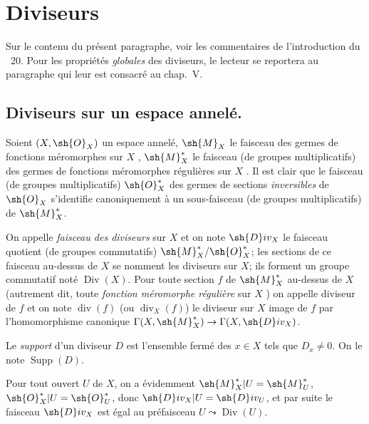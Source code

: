 \section{Diviseurs}
\label{section:IV.21}

Sur le contenu du présent paragraphe, voir les commentaires de l'introduction du \textsection~20.
Pour les propriétés \emph{globales} des diviseurs, le lecteur se reportera au paragraphe qui leur est consacré au chap.~V.

\subsection{Diviseurs sur un espace annelé.}
\label{IV.21.1}

\begin{env}[21.1.1]
\label{IV.21.1.1}
Soient $(X,\sh{O}_X)$ un espace annelé, $\sh{M}_X$ le faisceau des germes de fonctions méromorphes sur $X$ , $\sh{M}_X^*$ le faisceau (de groupes multiplicatifs) des germes de fonctions méromorphes régulières sur $X$ .
Il est clair que le faisceau (de groupes multiplicatifs) $\sh{O}_X^*$ des germes de sections \emph{inversibles} de $\sh{O}_X$ s'identifie canoniquement à un sous-faisceau (de groupes multiplicatifs) de $\sh{M}_X^*$.
\end{env}

\begin{definition}[21.1.2]
On appelle \emph{faisceau des diviseurs} sur $X$ et on note $\sh{D}iv_X$ le faisceau quotient (de groupes commutatifs) $\sh{M}_X^*/\sh{O}_X^*$;
les sections de ce faisceau au-dessus de $X$ se nomment les diviseurs sur $X$; ils forment un groupe commutatif noté $\operatorname{Div}(X)$.
Pour toute section $f$ de $\sh{M}_X^*$ au-dessus de $X$ \textup{(autrement dit, toute \emph{fonction méromorphe régulière} sur $X$ )} on appelle diviseur de $f$ et on note $\operatorname{div}(f)$ \textup{(ou $\operatorname{div}_X(f)$)} le diviseur sur $X$ image de $f$ par l'homomorphisme canonique $\Gamma(X,\sh{M}_X^*)\to\Gamma(X,\sh{D}iv_X)$.
\end{definition}


Le \emph{support} d'un diviseur $D$ est l'ensemble fermé des $x\in X$ tels que $D_x\neq0$.
On le note $\operatorname{Supp}(D)$.

Pour tout ouvert $U$ de $X$, on a évidemment $\sh{M}_X^*|U=\sh{M}_U^*$, $\sh{O}_X^*|U=\sh{O}_U^*$, donc $\sh{D}iv_X|U=\sh{D}iv_U$, et par suite le faisceau $\sh{D}iv_X$ est égal au préfaisceau $U\leadsto\operatorname{Div}(U)$.

